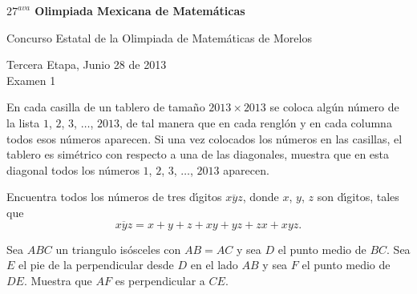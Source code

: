 \documentclass [12pt]{article}
\begin{document}
\begin{center}
          {\bf\Large $27^{ava}$ Olimpiada Mexicana de Matem\'aticas}
          \vspace{.5cm}

          Concurso Estatal de la Olimpiada de Matem\'aticas de Morelos

	    \vspace{.3cm}
          Tercera Etapa, Junio 28 de 2013\\
          Examen 1
\end{center}
	

\vspace{.5in}


 En cada casilla de un tablero de tama\~no $2013 \times 2013$ se coloca
alg\'un n\'umero de la lista $1$, $2$, $3$, $\dots$, $2013$, de tal manera que en cada rengl\'on y en 
cada columna todos esos n\'umeros aparecen. Si una vez colocados los n\'umeros en las casillas, 
el tablero es sim\'etrico con respecto a una de las diagonales, muestra que en esta diagonal todos los 
n\'umeros $1$, $2$, $3$, $\dots$, $2013$ aparecen.

\vspace{.6in}


 Encuentra todos los n\'umeros de tres d\'{\i}gitos $\overline{xyz}$, donde
$x$, $y$, $z$ son d\'{\i}gitos, tales que 
$$\overline{xyz}=x+y+z+xy+yz+zx+xyz.$$

\vspace{.6in}

 Sea $ABC$ un triangulo is\'osceles con $AB=AC$  y sea $D$ el punto  medio
de $BC$. Sea $E$ el pie de la perpendicular desde $D$ en el lado $AB$ y sea $F$ el punto medio de $DE$.
Muestra que $AF$ es perpendicular a $CE$.
\end{document}
